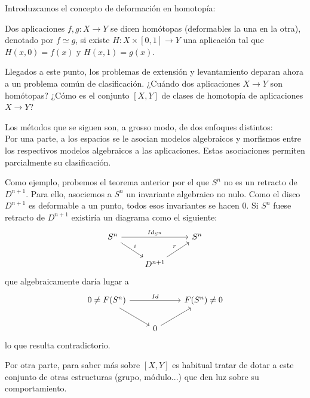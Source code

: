 Introduzcamos el concepto de deformación en homotopía:
\begin{defin}
Dos aplicaciones $f, g : X \longrightarrow Y$ se dicen homótopas (deformables la una en la otra), denotado por $f \simeq g$, si existe  $H : X \times [0,1] \longrightarrow Y$ una aplicación tal que $H(x ,0) = f(x)$ y $H(x, 1) = g(x)$.
\end{defin}
Llegados a este punto, los problemas de extensión y levantamiento deparan ahora a un problema común de clasificación. ¿Cuándo dos aplicaciones $X \longrightarrow Y$ son homótopas? ¿Cómo es el conjunto $[X, Y]$ de clases de homotopía de aplicaciones $X \longrightarrow Y$? \par 
Los métodos que se siguen son, a grosso modo, de dos enfoques distintos:\\
Por una parte, a los espacios se le asocian modelos algebraicos y morfismos entre los respectivos modelos algebraicos a las aplicaciones. Estas asociaciones permiten parcialmente su clasificación. \par 
Como ejemplo, probemos el teorema anterior por el que $S^n$ no es un retracto de $D^{n+1}$. Para ello, asociemos a $S^n$ un invariante algebraico no nulo. Como el disco $D^{n+1}$ es deformable a un punto, todos esos invariantes se hacen 0. Si $S^n$ fuese retracto de $D^{n+1}$ existiría un diagrama como el siguiente:
$$
\begin{tikzcd}
	S^n \arrow{rr}{Id_{S^n}} \drar{i} & & S^n \\
		&	D^{n+1} \urar{r} & 
\end{tikzcd}
$$
que algebraicamente daría lugar a 
$$
\begin{tikzcd}
	0 \neq F(S^n) \arrow{rr}{Id} \drar & &  F(S^n) \neq 0 \\
		&	0 \urar & 
\end{tikzcd}
$$
lo que resulta contradictorio. \par

Por otra parte, para saber más sobre $[X, Y]$ es habitual tratar de dotar a este conjunto de otras estructuras (grupo, módulo...) que den luz sobre su comportamiento. 

